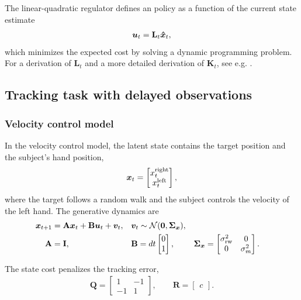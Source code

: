 \documentclass{article}
\begin{document}
The linear-quadratic regulator defines an policy as a function of the current state estimate
\begin{align}
    {\bm u}_t = \mathbf L_t {\bm{\hat x}}_t,
\end{align}
which minimizes the expected cost by solving a dynamic programming problem. For a derivation of $\mathbf L_t$ and a more detailed derivation of $\mathbf K_t$, see e.g. \citet{kochenderfer2022algorithms}. 

\subsection{Tracking task with delayed observations}



\subsubsection{Velocity control model}
In the velocity control model, the latent state contains the target position and the subject's hand position,
\begin{align}
    {\bm x}_t = \begin{bmatrix}
        x^\text{right}_t \\ x^\text{left}_t
    \end{bmatrix},
\end{align}
where the target follows a random walk and the subject controls the velocity of the left hand. The generative dynamics are
\begin{align}
    {\bm x}_{t+1} &= \mathbf A {\bm x}_t + \mathbf B {\bm u}_t + {\bm v}_t,
    && {\bm v}_t \sim \operatorname{\mathcal{N}}(\mathbf 0, \mathbf \Sigma_{\bm x}), \\
    \mathbf A &= \operatorname{{\mathbf{I}}},
    && \mathbf B = dt \begin{bmatrix} 0 \\ 1 \end{bmatrix},
    && \mathbf \Sigma_{\bm x} = \begin{bmatrix} \sigma_\text{rw}^2 & 0 \\ 0 & \sigma_m^2 \end{bmatrix}.
\end{align}

The state cost penalizes the tracking error,
\begin{align}
    \mathbf Q = \begin{bmatrix}
        1 & -1 \\
        -1 & 1
    \end{bmatrix},
    \qquad
    \mathbf R = \begin{bmatrix} c \end{bmatrix}.
\end{align}
\end{document}
